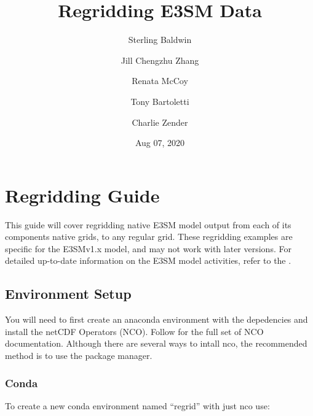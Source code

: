 \documentclass[letterpaper,10pt,english]{sphinxmanual}
\title{Regridding E3SM Data}
\date{Aug 07, 2020}
\author{Sterling Baldwin \and Jill Chengzhu Zhang \and Renata McCoy \and Tony Bartoletti \and Charlie Zender}
\begin{document}
\pagestyle{empty}
\sphinxmaketitle
\pagestyle{plain}
\sphinxtableofcontents
\pagestyle{normal}
\label{\detokenize{index::doc}}



\chapter{Regridding Guide}
\label{\detokenize{guide:regridding-guide}}\label{\detokenize{guide:guide}}\label{\detokenize{guide::doc}}
This guide will cover regridding native E3SM model output from each of its components native grids, to
any regular grid. These regridding examples are specific for the E3SMv1.x model, and may not work with later versions. For detailed up-to-date information on the
E3SM model activities, refer to the .


\section{Environment Setup}
\label{\detokenize{guide:environment-setup}}
You will need to first create an anaconda environment with the depedencies and install the netCDF Operators (NCO).
Follow  for the full set of NCO documentation.
Although there are several ways to intall nco, the recommended method is to use the  package manager.


\subsection{Conda}
\label{\detokenize{guide:id1}}
\begin{sphinxVerbatim}[commandchars=\\\{\}]
    
\end{sphinxVerbatim}

To create a new conda environment named “regrid” with just nco use:

\begin{sphinxVerbatim}[commandchars=\\\{\}]
      
\end{sphinxVerbatim}
\end{document}
